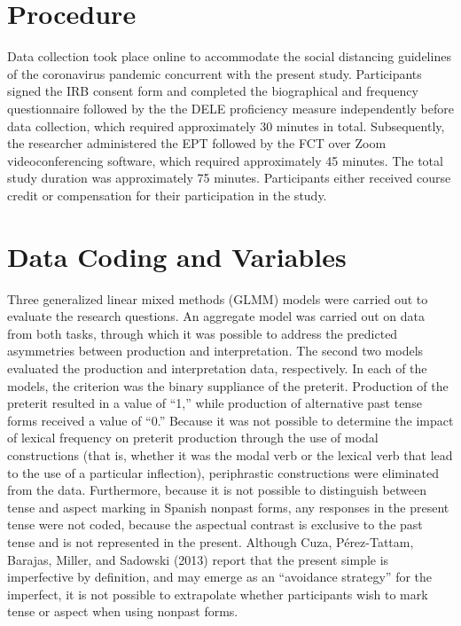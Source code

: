 \documentclass[
  english,
  man,floatsintext]{apa6}
\begin{document}
\hypertarget{procedure}{%
\section{Procedure}\label{procedure}}

Data collection took place online to accommodate the social distancing guidelines of the coronavirus pandemic concurrent with the present study. Participants signed the IRB consent form and completed the biographical and frequency questionnaire followed by the the DELE proficiency measure independently before data collection, which required approximately 30 minutes in total. Subsequently, the researcher administered the EPT followed by the FCT over Zoom videoconferencing software, which required approximately 45 minutes. The total study duration was approximately 75 minutes. Participants either received course credit or compensation for their participation in the study.

\hypertarget{data-coding-and-variables}{%
\section{Data Coding and Variables}\label{data-coding-and-variables}}

Three generalized linear mixed methods (GLMM) models were carried out to evaluate the research questions. An aggregate model was carried out on data from both tasks, through which it was possible to address the predicted asymmetries between production and interpretation. The second two models evaluated the production and interpretation data, respectively. In each of the models, the criterion was the binary suppliance of the preterit. Production of the preterit resulted in a value of ``1,'' while production of alternative past tense forms received a value of ``0.'' Because it was not possible to determine the impact of lexical frequency on preterit production through the use of modal constructions (that is, whether it was the modal verb or the lexical verb that lead to the use of a particular inflection), periphrastic constructions were eliminated from the data. Furthermore, because it is not possible to distinguish between tense and aspect marking in Spanish nonpast forms, any responses in the present tense were not coded, because the aspectual contrast is exclusive to the past tense and is not represented in the present. Although Cuza, Pérez-Tattam, Barajas, Miller, and Sadowski (2013) report that the present simple is imperfective by definition, and may emerge as an ``avoidance strategy'' for the imperfect, it is not possible to extrapolate whether participants wish to mark tense or aspect when using nonpast forms.
\end{document}
